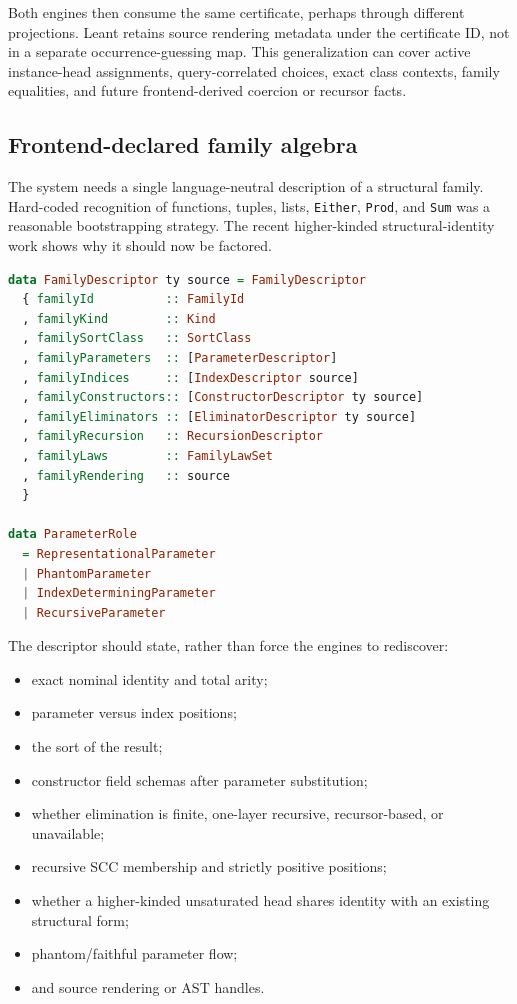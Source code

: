 \documentclass[11pt]{article}
\newcommand{\code}[1]{\texttt{#1}}
\newcommand{\Leant}{\textsf{Leant}}
\begin{document}
Both engines then consume the same certificate, perhaps through different
projections.  \Leant{} retains source rendering metadata under the certificate
ID, not in a separate occurrence-guessing map.  This generalization can cover
active instance-head assignments, query-correlated choices, exact class
contexts, family equalities, and future frontend-derived coercion or recursor
facts.

\subsection{Frontend-declared family algebra}
\label{sec:family-algebra}

The system needs a single language-neutral description of a structural family.
Hard-coded recognition of functions, tuples, lists, \code{Either},
\code{Prod}, and \code{Sum} was a reasonable bootstrapping strategy.  The
recent higher-kinded structural-identity work shows why it should now be
factored.

\begin{lstlisting}[language=Haskell,caption={Sketch of a family descriptor supplied at the checked boundary.}]
data FamilyDescriptor ty source = FamilyDescriptor
  { familyId          :: FamilyId
  , familyKind        :: Kind
  , familySortClass   :: SortClass
  , familyParameters  :: [ParameterDescriptor]
  , familyIndices     :: [IndexDescriptor source]
  , familyConstructors:: [ConstructorDescriptor ty source]
  , familyEliminators :: [EliminatorDescriptor ty source]
  , familyRecursion   :: RecursionDescriptor
  , familyLaws        :: FamilyLawSet
  , familyRendering   :: source
  }

data ParameterRole
  = RepresentationalParameter
  | PhantomParameter
  | IndexDeterminingParameter
  | RecursiveParameter
\end{lstlisting}

The descriptor should state, rather than force the engines to rediscover:

\begin{itemize}
  \item exact nominal identity and total arity;
  \item parameter versus index positions;
  \item the sort of the result;
  \item constructor field schemas after parameter substitution;
  \item whether elimination is finite, one-layer recursive, recursor-based, or
    unavailable;
  \item recursive SCC membership and strictly positive positions;
  \item whether a higher-kinded unsaturated head shares identity with an
    existing structural form;
  \item phantom/faithful parameter flow;
  \item and source rendering or AST handles.
\end{itemize}
\end{document}
